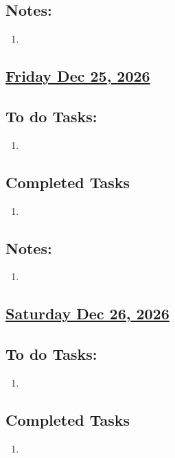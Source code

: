 \subsection*{Notes:}
\begin{enumerate}
    \item 
\end{enumerate}
\subsection*{\underline{Friday Dec 25, 2026}}
\subsection*{To do Tasks:}
\begin{enumerate}
    \item  
\end{enumerate}
\subsection*{Completed Tasks}
\begin{enumerate}[\ding{52}]  %
    \item 
\end{enumerate}
\subsection*{Notes:}
\begin{enumerate}
    \item 
\end{enumerate}
\subsection*{\underline{Saturday Dec 26, 2026} }
\subsection*{To do Tasks:}
\begin{enumerate}
    \item 
\end{enumerate}
\subsection*{Completed Tasks}
\begin{enumerate}[\ding{52}]  %
    \item 
\end{enumerate}
